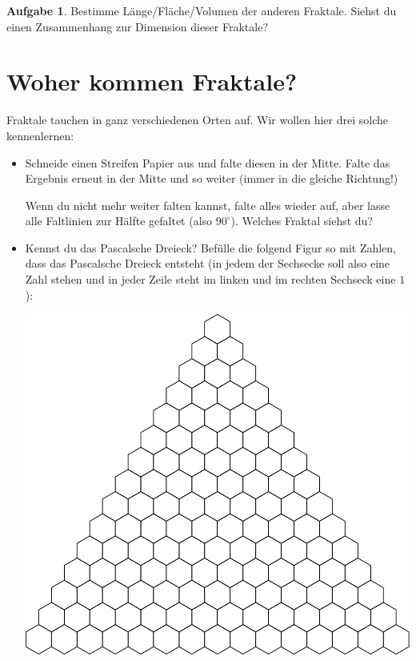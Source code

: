 \documentclass[a4paper,ngerman,12pt]{scrartcl}
\theoremstyle{definition}
\newtheorem{aufg}{Aufgabe}
\theoremstyle{plain}
\theoremstyle{remark}
\begin{document}
\begin{aufg}
	Bestimme Länge/Fläche/Volumen der anderen Fraktale. Siehst du einen Zusammenhang zur Dimension dieser Fraktale?
\end{aufg}


\section{Woher kommen Fraktale?}

Fraktale tauchen in ganz verschiedenen Orten auf. Wir wollen hier drei solche kennenlernen:

\begin{itemize}
	\item Schneide einen Streifen Papier aus und falte diesen in der Mitte. Falte das Ergebnis erneut in der Mitte und so weiter (immer in die gleiche Richtung!)

	Wenn du nicht mehr weiter falten kannst, falte alles wieder auf, aber lasse alle Faltlinien zur Hälfte gefaltet (also $90^\circ$). Welches Fraktal siehst du?
	
	\item Kennst du das Pascalsche Dreieck? Befülle die folgend Figur so mit Zahlen, dass das Pascalsche Dreieck entsteht (in jedem der Sechsecke soll also eine Zahl stehen und in jeder Zeile steht im linken und im rechten Sechseck eine $1$):
		
		\begin{center}
				\includegraphics[width=.9\textwidth]{Bilder/Pascalsches-Dreieck.pdf}
		\end{center}
	

\end{itemize}
\end{document}
